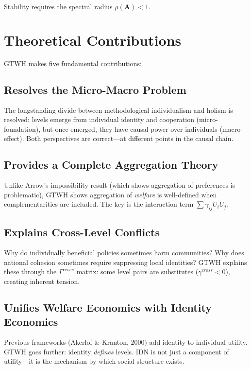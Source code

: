 \documentclass[12pt,a4paper]{article}
\begin{document}
Stability requires the spectral radius $\rho(\mathbf{A}) < 1$.

\section{Theoretical Contributions}
\label{sec:contributions}

GTWH makes five fundamental contributions:

\subsection{Resolves the Micro-Macro Problem}

The longstanding divide between methodological individualism and holism is 
resolved: levels emerge from individual identity and cooperation (micro-foundation), 
but once emerged, they have causal power over individuals (macro-effect). 
Both perspectives are correct---at different points in the causal chain.

\subsection{Provides a Complete Aggregation Theory}

Unlike Arrow's impossibility result (which shows aggregation of preferences 
is problematic), GTWH shows aggregation of \textit{welfare} is well-defined 
when complementarities are included. The key is the interaction term 
$\sum \gamma_{ij} U_i U_j$.

\subsection{Explains Cross-Level Conflicts}

Why do individually beneficial policies sometimes harm communities? 
Why does national cohesion sometimes require suppressing local identities? 
GTWH explains these through the $\Gamma^{cross}$ matrix: some level pairs 
are substitutes ($\gamma^{cross} < 0$), creating inherent tension.

\subsection{Unifies Welfare Economics with Identity Economics}

Previous frameworks (Akerlof \& Kranton, 2000) add identity to individual 
utility. GTWH goes further: identity \textit{defines} levels. IDN is not 
just a component of utility---it is the mechanism by which social structure exists.
\end{document}

